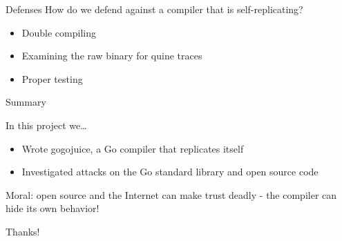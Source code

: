 \documentclass{beamer}
\begin{document}
\begin{frame}{Defenses}
How do we defend against a compiler that is self-replicating?
\begin{itemize}
\item Double compiling
\item Examining the raw binary for quine traces
\item Proper testing
\end{itemize}
\end{frame}

\begin{frame}{Summary}

In this project we\dots
  \begin{itemize}
  \item Wrote gogojuice, a Go compiler that replicates itself
  \item Investigated attacks on the Go standard library and open source code
  \end{itemize}

\pause
\alert{Moral}: open source and the Internet can make trust deadly - the compiler can hide its own behavior!
  
\end{frame}

\begin{frame}
\Huge
Thanks!
\end{frame}
\end{document}
